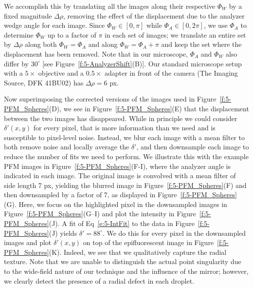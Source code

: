 We accomplish this by translating all the images along their respective $\Phi_W$ by a fixed magnitude $\Delta \rho$, removing the effect of the displacement due to the analyzer wedge angle for each image.
Since $\Phi_W \in [0,\pi]$ while $\Phi_A \in [0, 2 \pi]$, we use $\Phi_A$ to determine $\Phi_W$ up to a factor of $\pi$ in each set of images; we translate an entire set by $\Delta \rho$ along both $\Phi_W = \Phi_A$ and along $\Phi_W = \Phi_A + \pi$ and keep the set where the displacement has been removed.
Note that in our microscope, $\Phi_A$ and $\Phi_W$ also differ by $30^{\circ}$ [see Figure~\ref{f:5-AnalyzerShift}(B)].
Our standard microscope setup with a $5\times$ objective and a $0.5 \times$ adapter in front of the camera (The Imaging Source, DFK 41BU02) has $\Delta \rho = 6$ px.

Now superimposing the corrected versions of the images used in Figure~\ref{f:5-PFM_Spheres}(D), we see in Figure~\ref{f:5-PFM_Spheres}(E) that the displacement between the two images has disappeared.
While in principle we could consider $\delta'(x,y)$ for every pixel, that is more information than we need and is susceptible to pixel-level noise.
Instead, we blur each image with a mean filter to both remove noise and locally average the $\delta'$, and then downsample each image to reduce the number of fits we need to perform.
We illustrate this with the example PFM images in Figure~\ref{f:5-PFM_Spheres}(F-I), where the analyzer angle is indicated in each image.
The original image is convolved with a mean filter of side length 7 px, yielding the blurred image in Figure~\ref{f:5-PFM_Spheres}(F) and then downsampled by a factor of 7, as displayed in Figure~\ref{f:5-PFM_Spheres}(G).
Here, we focus on the highlighted pixel in the downsampled images in Figure~\ref{f:5-PFM_Spheres}(G--I) and plot the intensity in Figure~\ref{f:5-PFM_Spheres}(J).
A fit of Eq~\ref{e:5-IntFit} to the data in Figure~\ref{f:5-PFM_Spheres}(J) yields $\delta' = 88^{\circ}$.
We do this for every pixel in the downsampled images and plot $\delta'(x,y)$ on top of the epifluorescent image in Figure~\ref{f:5-PFM_Spheres}(K).
Indeed, we see that we qualitatively capture the radial texture.
Note that we are unable to distinguish the actual point singularity due to the wide-field nature of our technique and the influence of the mirror; however, we clearly detect the presence of a radial defect in each droplet.
